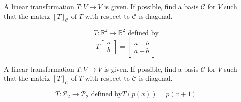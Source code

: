 \documentclass[11pt,letterpaper,boxed]{pset}
\begin{document}
    \begin{problem} [6.6 \# 32]
    A linear transformation $T:V\xrightarrow{} V$ is given. If possible, find a basis $\mathscr{C}$ for $V$ such that the matrix $[T]_\mathscr{C}$ of $T$ with respect to $\mathscr{C}$ is diagonal.
    
    \[T:\mathbb{R}^2 \xrightarrow{} \mathbb{R}^2 \text{ defined by} \] \[T\begin{bmatrix}a\\b\end{bmatrix} = \begin{bmatrix}a-b\\a+b\end{bmatrix}\]
    
    \end{problem}
    \newpage
    
    
    \begin{problem} [6.6 \#34]
    A linear transformation $T:V\xrightarrow{} V$ is given. If possible, find a basis $\mathscr{C}$ for $V$ such that the matrix $[T]_\mathscr{C}$ of $T$ with respect to $\mathscr{C}$ is diagonal.
    
    \[T:\mathscr{P}_2 \xrightarrow{} \mathscr{P}_2 \text{ defined by} T(p(x)) = p(x+1)\]
    \end{problem}
    \newpage
    
\end{document}
